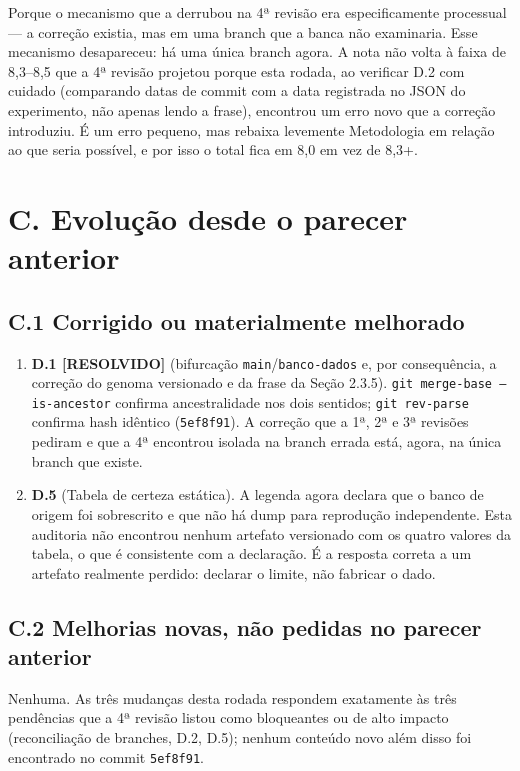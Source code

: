\documentclass[11pt,a4paper]{article}
\newcommand{\resolvido}{\textbf{\color{green!40!black}[RESOLVIDO]}}
\begin{document}
Porque o mecanismo que a derrubou na 4ª revisão era especificamente processual --- a correção existia,
mas em uma branch que a banca não examinaria. Esse mecanismo desapareceu: há uma única branch agora.
A nota não volta à faixa de 8,3--8,5 que a 4ª revisão projetou porque esta rodada, ao verificar D.2 com
cuidado (comparando datas de commit com a data registrada no JSON do experimento, não apenas lendo a
frase), encontrou um erro novo que a correção introduziu. É um erro pequeno, mas rebaixa levemente
Metodologia em relação ao que seria possível, e por isso o total fica em 8,0 em vez de 8,3+.

\section*{C. Evolução desde o parecer anterior}

\subsection*{C.1 Corrigido ou materialmente melhorado}

\begin{enumerate}
  \item \textbf{D.1 \resolvido} (bifurcação \texttt{main}/\texttt{banco-dados} e, por consequência, a
  correção do genoma versionado e da frase da Seção 2.3.5). \texttt{git merge-base --is-ancestor}
  confirma ancestralidade nos dois sentidos; \texttt{git rev-parse} confirma hash idêntico
  (\texttt{5ef8f91}). A correção que a 1ª, 2ª e 3ª revisões pediram e que a 4ª encontrou isolada na
  branch errada está, agora, na única branch que existe.
  \item \textbf{D.5} (Tabela de certeza estática). A legenda agora declara que o banco de origem foi
  sobrescrito e que não há dump para reprodução independente. Esta auditoria não encontrou nenhum
  artefato versionado com os quatro valores da tabela, o que é consistente com a declaração. É a
  resposta correta a um artefato realmente perdido: declarar o limite, não fabricar o dado.
\end{enumerate}

\subsection*{C.2 Melhorias novas, não pedidas no parecer anterior}

Nenhuma. As três mudanças desta rodada respondem exatamente às três pendências que a 4ª revisão listou
como bloqueantes ou de alto impacto (reconciliação de branches, D.2, D.5); nenhum conteúdo novo além
disso foi encontrado no commit \texttt{5ef8f91}.
\end{document}
